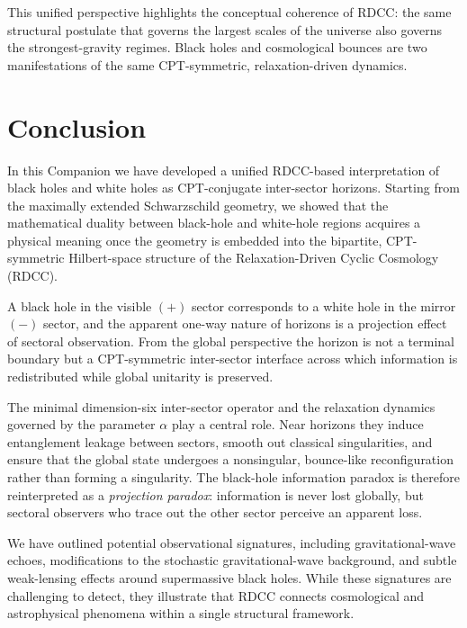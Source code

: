 \documentclass[11pt,a4paper]{article}
\begin{document}
This unified perspective highlights the conceptual coherence of RDCC: the same structural
postulate that governs the largest scales of the universe also governs the strongest-gravity
regimes. Black holes and cosmological bounces are two manifestations of the same
CPT-symmetric, relaxation-driven dynamics.


\section{Conclusion}

In this Companion we have developed a unified RDCC-based interpretation of black holes
and white holes as CPT-conjugate inter-sector horizons. Starting from the maximally
extended Schwarzschild geometry, we showed that the mathematical duality between
black-hole and white-hole regions acquires a physical meaning once the geometry is
embedded into the bipartite, CPT-symmetric Hilbert-space structure of the
Relaxation-Driven Cyclic Cosmology (RDCC).

A black hole in the visible $(+)$ sector corresponds to a white hole in the mirror $(-)$
sector, and the apparent one-way nature of horizons is a projection effect of sectoral
observation. From the global perspective the horizon is not a terminal boundary but a
CPT-symmetric inter-sector interface across which information is redistributed while
global unitarity is preserved.

The minimal dimension-six inter-sector operator and the relaxation dynamics governed by
the parameter $\alpha$ play a central role. Near horizons they induce entanglement
leakage between sectors, smooth out classical singularities, and ensure that the global
state undergoes a nonsingular, bounce-like reconfiguration rather than forming a
singularity. The black-hole information paradox is therefore reinterpreted as a
\emph{projection paradox}: information is never lost globally, but sectoral observers who
trace out the other sector perceive an apparent loss.

We have outlined potential observational signatures, including gravitational-wave echoes,
modifications to the stochastic gravitational-wave background, and subtle weak-lensing
effects around supermassive black holes. While these signatures are challenging to detect,
they illustrate that RDCC connects cosmological and astrophysical phenomena within a
single structural framework.
\end{document}
